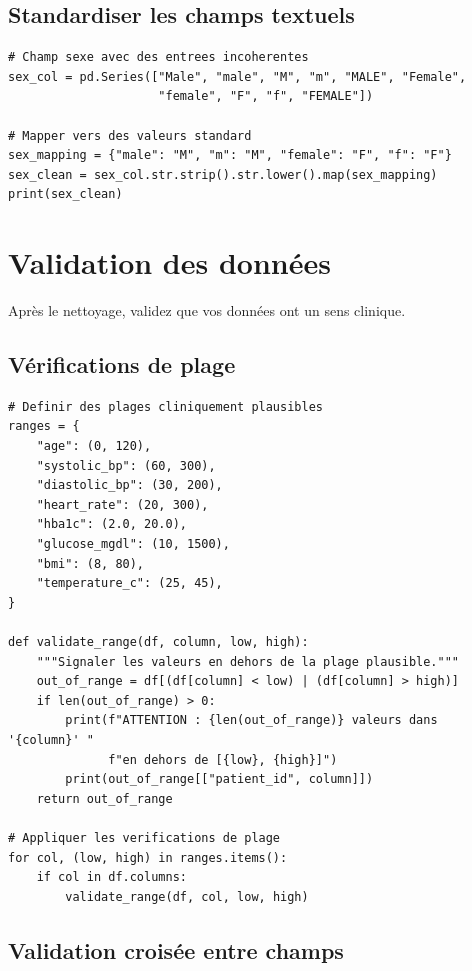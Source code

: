 \subsection{Standardiser les champs textuels}

\begin{verbatim}
# Champ sexe avec des entrees incoherentes
sex_col = pd.Series(["Male", "male", "M", "m", "MALE", "Female",
                     "female", "F", "f", "FEMALE"])

# Mapper vers des valeurs standard
sex_mapping = {"male": "M", "m": "M", "female": "F", "f": "F"}
sex_clean = sex_col.str.strip().str.lower().map(sex_mapping)
print(sex_clean)
\end{verbatim}

\section{Validation des donn\'ees}

Apr\`es le nettoyage, validez que vos donn\'ees ont un sens clinique.

\subsection{V\'erifications de plage}

\begin{verbatim}
# Definir des plages cliniquement plausibles
ranges = {
    "age": (0, 120),
    "systolic_bp": (60, 300),
    "diastolic_bp": (30, 200),
    "heart_rate": (20, 300),
    "hba1c": (2.0, 20.0),
    "glucose_mgdl": (10, 1500),
    "bmi": (8, 80),
    "temperature_c": (25, 45),
}

def validate_range(df, column, low, high):
    """Signaler les valeurs en dehors de la plage plausible."""
    out_of_range = df[(df[column] < low) | (df[column] > high)]
    if len(out_of_range) > 0:
        print(f"ATTENTION : {len(out_of_range)} valeurs dans '{column}' "
              f"en dehors de [{low}, {high}]")
        print(out_of_range[["patient_id", column]])
    return out_of_range

# Appliquer les verifications de plage
for col, (low, high) in ranges.items():
    if col in df.columns:
        validate_range(df, col, low, high)
\end{verbatim}

\subsection{Validation crois\'ee entre champs}

